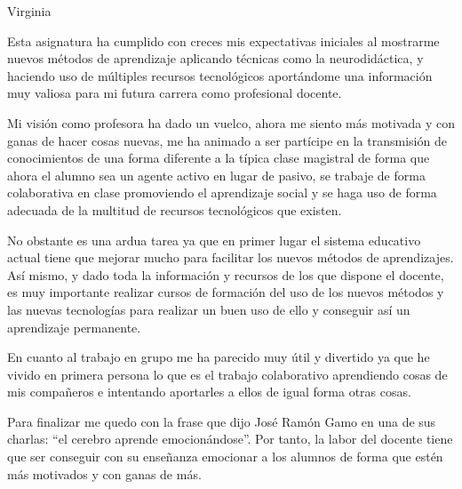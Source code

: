 \begin{opin}{\virgicolor}{Virginia}

Esta asignatura ha cumplido con creces mis expectativas iniciales al mostrarme nuevos métodos de aprendizaje aplicando técnicas como la neurodidáctica, y haciendo uso de múltiples recursos tecnológicos aportándome una información muy valiosa para mi futura carrera como profesional docente.

Mi visión como profesora ha dado un vuelco, ahora me siento más motivada y con ganas de hacer cosas nuevas, me ha animado a ser partícipe en la transmisión de conocimientos de una forma diferente a la típica clase magistral de forma que ahora el alumno sea un agente activo en lugar de pasivo, se trabaje de forma colaborativa en clase promoviendo el aprendizaje social y se haga uso de forma adecuada de la multitud de recursos tecnológicos que existen.

No obstante es una ardua tarea ya que en primer lugar el sistema educativo actual tiene que mejorar mucho para facilitar los nuevos métodos de aprendizajes. Así mismo, y dado toda la información y recursos de los que dispone el docente, es muy importante realizar cursos de formación del uso de los nuevos métodos y las nuevas tecnologías para realizar un buen uso de ello y conseguir así un aprendizaje permanente.

En cuanto al trabajo en grupo me ha parecido muy útil y divertido ya que he vivido en primera persona lo que es el trabajo colaborativo aprendiendo cosas de mis compañeros e intentando aportarles a ellos de igual forma otras cosas.

Para finalizar me quedo con la frase que dijo José Ramón Gamo en una de sus charlas: “el cerebro aprende emocionándose”. Por tanto, la labor del docente tiene que ser conseguir con su enseñanza emocionar a los alumnos de forma que estén más motivados y con ganas de más.

\end{opin}


